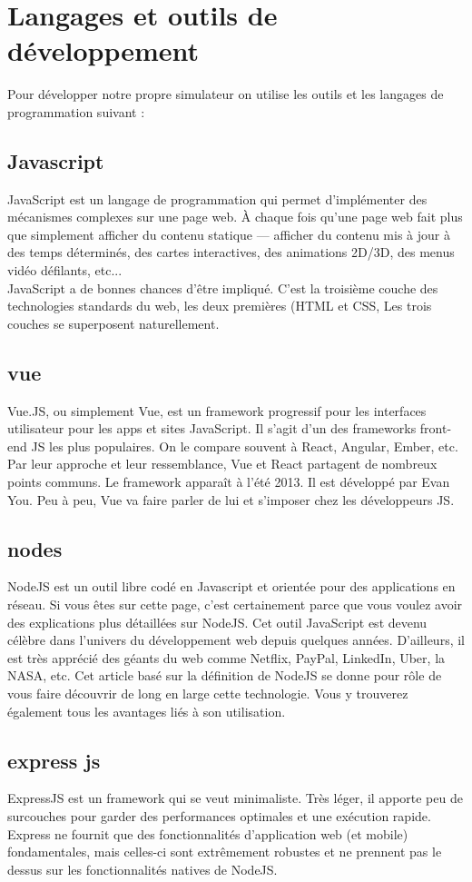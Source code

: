 \section{Langages et outils de développement}
Pour développer notre propre simulateur on utilise les outils et les langages de programmation suivant :

\subsection{Javascript}
JavaScript est un langage de programmation qui permet d’implémenter des mécanismes complexes sur une page web. À chaque fois qu’une page web fait plus que simplement afficher du contenu statique — afficher du contenu mis à jour à des temps déterminés, des cartes interactives, des animations 2D/3D, des menus vidéo défilants, etc... 
\\JavaScript a de bonnes chances d’être impliqué. C’est la troisième couche des technologies standards du web, les deux premières (HTML et CSS, Les trois couches se superposent naturellement. 

\subsection{vue}
Vue.JS, ou simplement Vue, est un framework progressif pour les interfaces utilisateur pour les apps et sites JavaScript. Il s’agit d’un des frameworks front-end JS les plus populaires. On le compare souvent à React, Angular, Ember, etc. Par leur approche et leur ressemblance, Vue et React partagent de nombreux points communs. Le framework apparaît à l’été 2013. Il est développé par Evan You. Peu à peu, Vue va faire parler de lui et s’imposer chez les développeurs JS.

\subsection{nodes}
NodeJS est un outil libre codé en Javascript et orientée pour des applications en réseau. Si vous êtes sur cette page, c’est certainement parce que vous voulez avoir des explications plus détaillées sur NodeJS. Cet outil JavaScript est devenu célèbre dans l’univers du développement web depuis quelques années. D’ailleurs, il est très apprécié des géants du web comme Netflix, PayPal, LinkedIn, Uber, la NASA, etc. Cet article basé sur la définition de NodeJS se donne pour rôle de vous faire découvrir de long en large cette technologie. Vous y trouverez également tous les avantages liés à son utilisation.

\subsection{express js}
ExpressJS est un framework qui se veut minimaliste. Très léger, il apporte peu de surcouches pour garder des performances optimales et une exécution rapide. Express ne fournit que des fonctionnalités d’application web (et mobile) fondamentales, mais celles-ci sont extrêmement robustes et ne prennent pas le dessus sur les fonctionnalités natives de NodeJS. 
